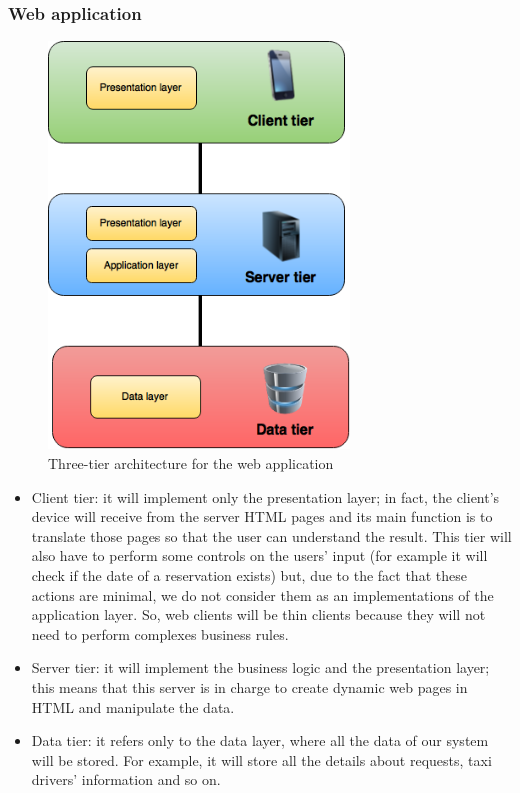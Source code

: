 \subsubsection{Web application}

    \begin{figure}[H]
        \centering
        \includegraphics[width=8cm]{./Images/WebApplication.png}
        \caption{Three-tier architecture for the web application}
    \end{figure}
    
    \begin{itemize}
        \item Client tier: it will implement only the presentation layer; in fact, the client's device will receive from the server HTML pages and its main function is to translate those pages so that the user can understand the result. 
        \newline 
        This tier will also have to perform some controls on the users' input (for example it will check if the date of a reservation exists) but, due to the fact that these actions are minimal, we do not consider them as an implementations of the application layer. So, web clients will be thin clients because they will not need to perform complexes business rules.
        \item Server tier: it will implement the business logic and the presentation layer; this means that this server is in charge to create dynamic web pages in HTML and manipulate the data.
        \item Data tier: it refers only to the data layer, where all the data of our system will be stored. For example, it will store all the details about requests, taxi drivers' information and so on.
    \end{itemize}
